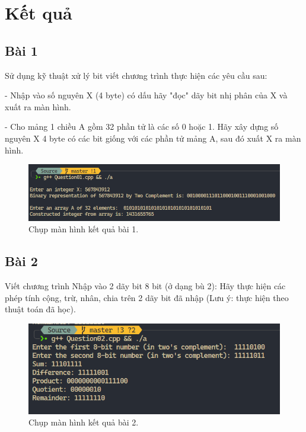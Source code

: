 \section{Kết quả}
\subsection{Bài 1}
Sử dụng kỹ thuật xử lý bit viết chương trình thực hiện các yêu cầu sau:

- Nhập vào số nguyên X (4 byte) có dấu hãy "đọc" dãy bit nhị phân của X và xuất ra màn hình.

- Cho mảng 1 chiều A gồm 32 phần tử là các số 0 hoặc 1. Hãy xây dựng số nguyên X 4 byte có các bit giống với các phần tử mảng A, sau đó xuất X ra màn hình.
	
\begin{figure}[H]
	\centering
	\includegraphics[width=\textwidth]{images/img1.PNG}
	\caption{Chụp màn hình kết quả bài 1.}
\end{figure}

\subsection{Bài 2}

Viết chương trình Nhập vào 2 dãy bit 8 bit (ở dạng bù 2):
Hãy thực hiện các phép tính cộng, trừ, nhân, chia trên 2 dãy bit đã nhập (Lưu ý: thực hiện theo thuật toán đã học).

\begin{figure}[H]
	\centering
	\includegraphics[width=\textwidth]{images/img2.PNG}
	\caption{Chụp màn hình kết quả bài 2.}
\end{figure}
